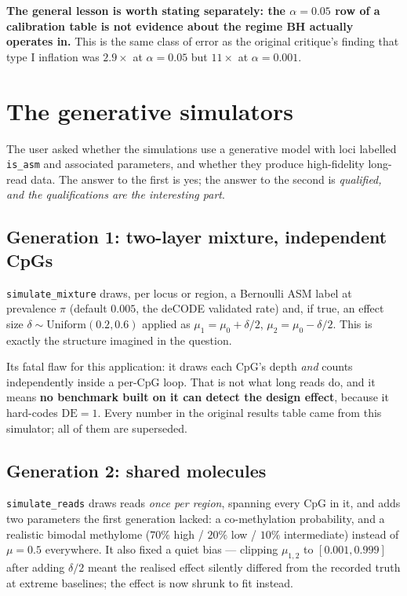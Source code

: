 \documentclass[11pt]{article}
\begin{document}
\textbf{The general lesson is worth stating separately: the $\alpha = 0.05$ row
of a calibration table is not evidence about the regime BH actually operates
in.} This is the same class of error as the original critique's finding that
type I inflation was $2.9\times$ at $\alpha = 0.05$ but $11\times$ at
$\alpha = 0.001$.

\section{The generative simulators}
\label{sec:sim}

The user asked whether the simulations use a generative model with loci labelled
\texttt{is\_asm} and associated parameters, and whether they produce
high-fidelity long-read data. The answer to the first is yes; the answer to the
second is \emph{qualified, and the qualifications are the interesting part}.

\subsection{Generation 1: two-layer mixture, independent CpGs}

\texttt{simulate\_mixture} draws, per locus or region, a Bernoulli ASM label at
prevalence $\pi$ (default $0.005$, the deCODE validated rate) and, if true, an
effect size $\delta \sim \mathrm{Uniform}(0.2, 0.6)$ applied as
$\mu_1 = \mu_0 + \delta/2$, $\mu_2 = \mu_0 - \delta/2$. This is exactly the
structure imagined in the question.

Its fatal flaw for this application: it draws each CpG's depth \emph{and} counts
independently inside a per-CpG loop. That is not what long reads do, and it means
\textbf{no benchmark built on it can detect the design effect}, because it
hard-codes $\mathrm{DE} = 1$. Every number in the original results table came
from this simulator; all of them are superseded.

\subsection{Generation 2: shared molecules}

\texttt{simulate\_reads} draws reads \emph{once per region}, spanning every CpG
in it, and adds two parameters the first generation lacked: a co-methylation
probability, and a realistic bimodal methylome ($70\%$ high / $20\%$ low /
$10\%$ intermediate) instead of $\mu = 0.5$ everywhere. It also fixed a quiet
bias --- clipping $\mu_{1,2}$ to $[0.001, 0.999]$ after adding $\delta/2$ meant
the realised effect silently differed from the recorded truth at extreme
baselines; the effect is now shrunk to fit instead.
\end{document}
